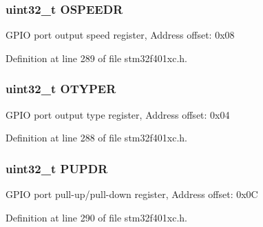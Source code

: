 \subsubsection[{\texorpdfstring{O\+S\+P\+E\+E\+DR}{OSPEEDR}}]{ uint32\+\_\+t O\+S\+P\+E\+E\+DR}\hypertarget{struct_g_p_i_o___type_def_a328d16cc6213783ede54e4059ffd50a3}{}\label{struct_g_p_i_o___type_def_a328d16cc6213783ede54e4059ffd50a3}
G\+P\+IO port output speed register, Address offset\+: 0x08 

Definition at line 289 of file stm32f401xc.\+h.

\subsubsection[{\texorpdfstring{O\+T\+Y\+P\+ER}{OTYPER}}]{ uint32\+\_\+t O\+T\+Y\+P\+ER}\hypertarget{struct_g_p_i_o___type_def_a9543592bda60cb5261075594bdeedac9}{}\label{struct_g_p_i_o___type_def_a9543592bda60cb5261075594bdeedac9}
G\+P\+IO port output type register, Address offset\+: 0x04 

Definition at line 288 of file stm32f401xc.\+h.

\subsubsection[{\texorpdfstring{P\+U\+P\+DR}{PUPDR}}]{ uint32\+\_\+t P\+U\+P\+DR}\hypertarget{struct_g_p_i_o___type_def_abeed38529bd7b8de082e490e5d4f1727}{}\label{struct_g_p_i_o___type_def_abeed38529bd7b8de082e490e5d4f1727}
G\+P\+IO port pull-\/up/pull-\/down register, Address offset\+: 0x0C 

Definition at line 290 of file stm32f401xc.\+h.



